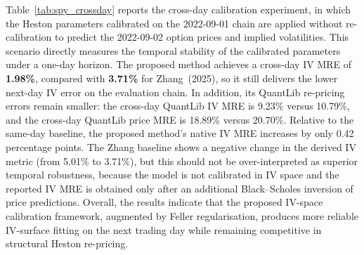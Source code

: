 Table~\ref{tab:spy_crossday} reports the cross-day calibration experiment, in which the Heston parameters calibrated on the 2022-09-01 chain are applied without re-calibration to predict the 2022-09-02 option prices and implied volatilities. This scenario directly measures the temporal stability of the calibrated parameters under a one-day horizon. The proposed method achieves a cross-day IV MRE of \textbf{1.98\%}, compared with \textbf{3.71\%} for Zhang~(2025), so it still delivers the lower next-day IV error on the evaluation chain. In addition, its QuantLib re-pricing errors remain smaller: the cross-day QuantLib IV MRE is 9.23\% versus 10.79\%, and the cross-day QuantLib price MRE is 18.89\% versus 20.70\%. Relative to the same-day baseline, the proposed method's native IV MRE increases by only 0.42 percentage points. The Zhang baseline shows a negative change in the derived IV metric (from 5.01\% to 3.71\%), but this should not be over-interpreted as superior temporal robustness, because the model is not calibrated in IV space and the reported IV MRE is obtained only after an additional Black--Scholes inversion of price predictions. Overall, the results indicate that the proposed IV-space calibration framework, augmented by Feller regularisation, produces more reliable IV-surface fitting on the next trading day while remaining competitive in structural Heston re-pricing.
